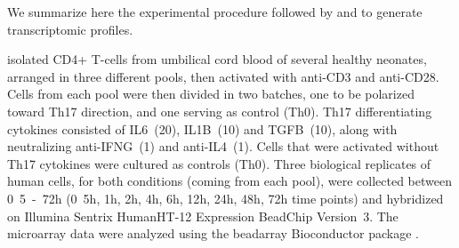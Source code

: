 
We summarize here the experimental procedure followed by \textcite{tuomela2012identification} and \textcite{yosef2013dynamic} to generate transcriptomic profiles.

\textcite{tuomela2012identification} isolated CD4+ T-cells from umbilical cord blood of several healthy neonates, arranged in three different pools, then activated with anti-CD3 and anti-CD28.
Cells from each pool were then divided in two batches, one to be polarized toward Th17 direction, and one serving as control (Th0).
Th17 differentiating cytokines consisted of IL6~(\unit{20}{\nano\gram\per\milli\liter}), IL1B~(\unit{10}{\nano\gram\per\milli\liter}) and TGFB~(\unit{10}{\nano\gram\per\milli\liter}), along with neutralizing anti-IFNG~(\unit{1}{\micro\gram\per\milli\liter}) and anti-IL4~(\unit{1}{\micro\gram\per\milli\liter}).
Cells that were activated without Th17 cytokines were cultured as controls (Th0).
Three biological replicates of human cells, for both conditions (coming from each pool), were collected between \unit{0.5-72}{h} (\unit{0.5}{h}, \unit{1}{h}, \unit{2}{h}, \unit{4}{h}, \unit{6}{h}, \unit{12}{h}, \unit{24}{h}, \unit{48}{h}, \unit{72}{h} time points) and hybridized on Illumina Sentrix HumanHT-12 Expression BeadChip Version~3.
The microarray data were analyzed using the beadarray Bioconductor package \parencite{dunning2007beadarray}.

